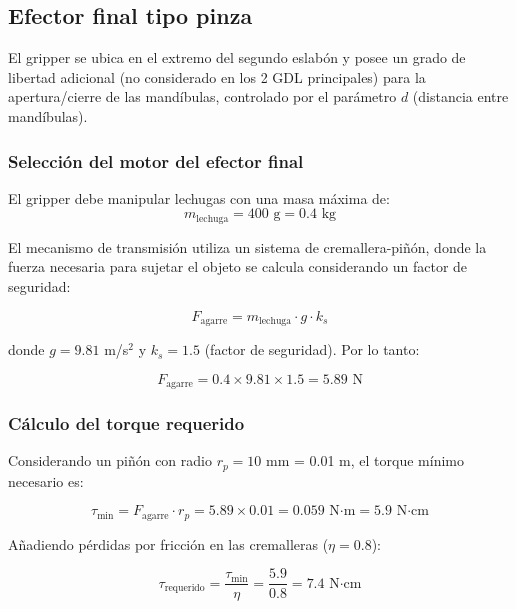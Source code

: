 \subsection{Efector final tipo pinza}
\label{sec:efector_final}
El gripper se ubica en el extremo del segundo eslabón y posee un grado de libertad adicional (no considerado en los 2 GDL principales) para la apertura/cierre de las mandíbulas, controlado por el parámetro $d$ (distancia entre mandíbulas).

\subsubsection{Selección del motor del efector final}
\label{sec:motor_gripper}
El gripper debe manipular lechugas con una masa máxima de:
\begin{equation}
m_{\text{lechuga}} = 400 \text{ g} = 0.4 \text{ kg}
\end{equation}

El mecanismo de transmisión utiliza un sistema de cremallera-piñón, donde la fuerza necesaria para sujetar el objeto se calcula considerando un factor de seguridad:

\begin{equation}
F_{\text{agarre}} = m_{\text{lechuga}} \cdot g \cdot k_s
\end{equation}

donde $g = 9.81$ m/s$^2$ y $k_s = 1.5$ (factor de seguridad). Por lo tanto:

\begin{equation}
F_{\text{agarre}} = 0.4 \times 9.81 \times 1.5 = 5.89 \text{ N}
\end{equation}

\subsubsection{Cálculo del torque requerido}

Considerando un piñón con radio $r_p = 10$ mm = 0.01 m, el torque mínimo necesario es:

\begin{equation}
\tau_{\text{min}} = F_{\text{agarre}} \cdot r_p = 5.89 \times 0.01 = 0.059 \text{ N·m} = 5.9 \text{ N·cm}
\end{equation}

Añadiendo pérdidas por fricción en las cremalleras ($\eta = 0.8$):

\begin{equation}
\tau_{\text{requerido}} = \frac{\tau_{\text{min}}}{\eta} = \frac{5.9}{0.8} = 7.4 \text{ N·cm}
\end{equation}

